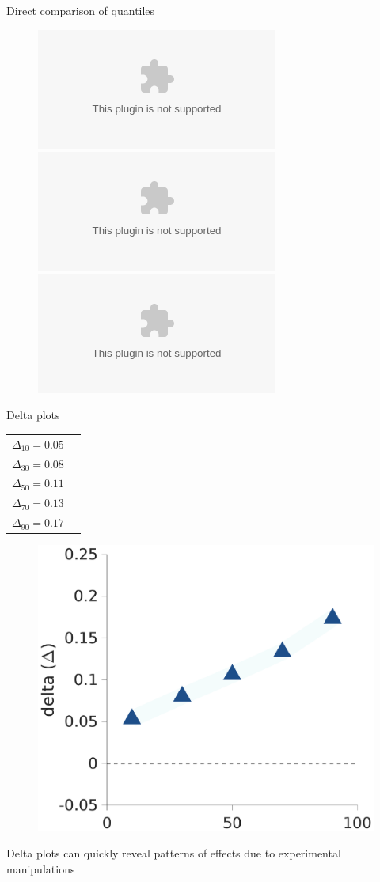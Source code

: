 \documentclass[aspectratio=169]{beamer}
\begin{document}
\begin{frame}[fragile]{Direct comparison of quantiles}
\begin{figure}[htp]
\centering
\includegraphics<1>[width=\textwidth]{deltasmall0.eps}%
\includegraphics<2>[width=\textwidth]{deltasmall1.eps}%
\includegraphics<3>[width=\textwidth]{deltasmall2.eps}
\end{figure}

\end{frame}



\begin{frame}[fragile]{Delta plots}
\begin{minipage}{.135\textwidth}\centering
\begin{tabular}{cc}
$\Delta_{10} = 0.05$\\
$\Delta_{30} = 0.08$\\
$\Delta_{50} = 0.11$\\
$\Delta_{70} = 0.13$\\
$\Delta_{90} = 0.17$\\
\end{tabular}
\end{minipage}
\begin{minipage}{.85\textwidth}
\begin{figure}[htp]
\centering
\includegraphics[scale=0.2,bb=00 0 1100 655,clip]{deltasmall3.eps}
\end{figure}
\end{minipage}\vspace{2ex}

Delta plots can quickly reveal patterns of effects due to experimental manipulations 
\end{frame}
\end{document}
